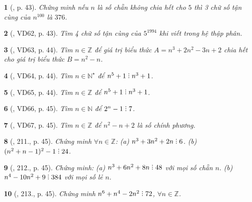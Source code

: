 \documentclass{article}
\newtheorem{baitoan}{}
\DeclareRobustCommand{\divby}{%
	\mathrel{\vbox{\baselineskip.65ex\lineskiplimit0pt\hbox{.}\hbox{.}\hbox{.}}}%
}
\begin{document}
\begin{baitoan}[\cite{Binh_Toan_8_tap_1}, p. 43]
	Chứng minh nếu $n$ là số chẵn không chia hết cho $5$ thì 3 chữ số tận cùng của $n^{100}$ là $376$.
\end{baitoan}

\begin{baitoan}[\cite{Binh_Toan_8_tap_1}, VD62, p. 43]
	Tìm 4 chữ số tận cùng của $5^{1994}$ khi viết trong hệ thập phân.
\end{baitoan}

\begin{baitoan}[\cite{Binh_Toan_8_tap_1}, VD63, p. 44]
	Tìm $n\in\mathbb{Z}$ để giá trị biểu thức $A = n^3 + 2n^2 - 3n + 2$ chia hết cho giá trị biểu thức $B = n^2 - n$.
\end{baitoan}

\begin{baitoan}[\cite{Binh_Toan_8_tap_1}, VD64, p. 44]
	Tìm $n\in\mathbb{N}^\star$ để $n^5 + 1\divby n^3 + 1$.
\end{baitoan}

\begin{baitoan}[\cite{Binh_Toan_8_tap_1}, VD65, p. 44]
	Tìm $n\in\mathbb{Z}$ để $n^5 + 1\divby n^3 + 1$.
\end{baitoan}

\begin{baitoan}[\cite{Binh_Toan_8_tap_1}, VD66, p. 45]
	Tìm $n\in\mathbb{N}$ để $2^n - 1\divby7$.
\end{baitoan}

\begin{baitoan}[\cite{Binh_Toan_8_tap_1}, VD67, p. 45]
	Tìm $n\in\mathbb{Z}$ để $n^2 - n + 2$ là số chính phương.
\end{baitoan}

\begin{baitoan}[\cite{Binh_Toan_8_tap_1}, 211., p. 45]
	Chứng minh $\forall n\in\mathbb{Z}$: (a) $n^3 + 3n^2 + 2n\divby6$. (b) $(n^2 + n - 1)^2 - 1\divby24$.
\end{baitoan}

\begin{baitoan}[\cite{Binh_Toan_8_tap_1}, 212., p. 45]
	Chứng minh: (a) $n^3 + 6n^2 + 8n\divby48$ với mọi số chẵn $n$. (b) $n^4 - 10n^2 + 9\divby384$ với mọi số lẻ $n$.
\end{baitoan}

\begin{baitoan}[\cite{Binh_Toan_8_tap_1}, 213., p. 45]
	Chứng minh $n^6 + n^4 - 2n^2\divby72$, $\forall n\in\mathbb{Z}$.
\end{baitoan}
\end{document}
